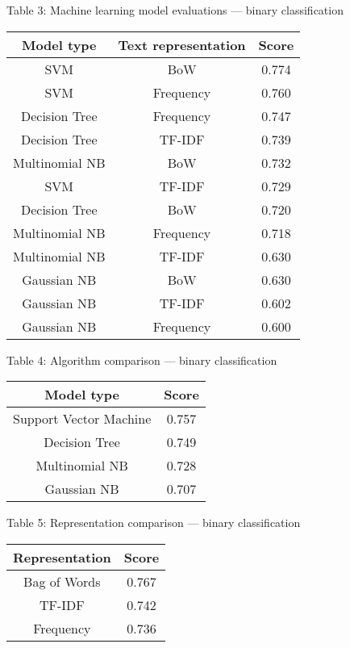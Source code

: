\documentclass{article}
\begin{document}
\begin{center}
Table 3: Machine learning model evaluations --- binary classification
\begin{tabular}{ |c|c|c| }
\hline {\bf Model type} & {\bf Text representation} & {\bf Score}\\
\hline SVM & BoW & 0.774\\
\hline SVM & Frequency & 0.760\\
\hline Decision Tree & Frequency & 0.747\\
\hline Decision Tree & TF-IDF & 0.739\\
\hline Multinomial NB & BoW & 0.732\\
\hline SVM & TF-IDF & 0.729\\
\hline Decision Tree & BoW & 0.720\\
\hline Multinomial NB & Frequency & 0.718\\
\hline Multinomial NB & TF-IDF & 0.630\\
\hline Gaussian NB & BoW & 0.630\\
\hline Gaussian NB & TF-IDF & 0.602\\
\hline Gaussian NB & Frequency & 0.600\\
\hline
\end{tabular}
\end{center}

\begin{center}
Table 4: Algorithm comparison --- binary classification\\
\begin{tabular}{ |c|c| }
\hline {\bf Model type}& {\bf Score}\\
\hline Support Vector Machine & 0.757\\
\hline Decision Tree & 0.749\\
\hline Multinomial NB & 0.728\\
\hline Gaussian NB & 0.707\\
\hline
\end{tabular}
\end{center}

\begin{center}
Table 5: Representation comparison --- binary classification\\
\begin{tabular}{ |c|c| }
\hline {\bf Representation}& {\bf Score}\\
\hline Bag of Words & 0.767\\
\hline TF-IDF & 0.742\\
\hline Frequency & 0.736\\
\hline
\end{tabular}
\end{center}
\end{document}
